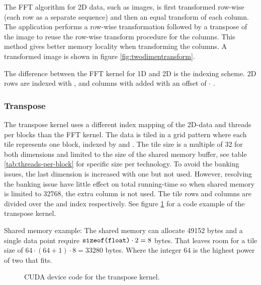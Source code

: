 The \gls{FFT} algorithm for \gls{2D} data, such as images, is first transformed row-wise (each row as a separate sequence) and then an equal transform of each column. The application performs a row-wise transformation followed by a transpose of the image to reuse the row-wise transform procedure for the columns. This method gives better memory locality when transforming the columns. A transformed image is shown in figure \ref{fig:twodimentransform}.

The difference between the \gls{FFT} kernel for \gls{1D} and \gls{2D} is the indexing scheme. \gls{2D} rows are indexed with , and columns with  added with an offset of  $\cdot$ .

\subsubsection{Transpose}

The transpose kernel uses a different index mapping of the 2D-data and threads per blocks than the \gls{FFT} kernel. The data is tiled in a grid pattern where each tile represents one block, indexed by  and . The tile size is a multiple of 32 for both dimensions and limited to the size of the shared memory buffer, see table \ref{tab:threads-per-block} for specific size per technology. To avoid the banking issues, the last dimension is increased with one but not used. However, resolving the banking issue have little effect on total running-time so when shared memory is limited to 32768, the extra column is not used. The tile rows and columns are divided over the  and  index respectively. See figure \ref{lst:cuda:device-transpose} for a code example of the transpose kernel.

Shared memory example: The {\CU} shared memory can allocate 49152 bytes and a single data point require $\texttt{sizeof(float)} \cdot 2 = 8$ bytes. That leaves room for a tile size of $64 \cdot (64 + 1) \cdot 8 = 33280$ bytes. Where the integer $64$ is the highest power of two that fits.

\begin{figure}
	\centering
	\begin{framed}
			
	\end{framed}
	\caption{CUDA device code for the transpose kernel.}
	\label{lst:cuda:device-transpose}	
\end{figure}

